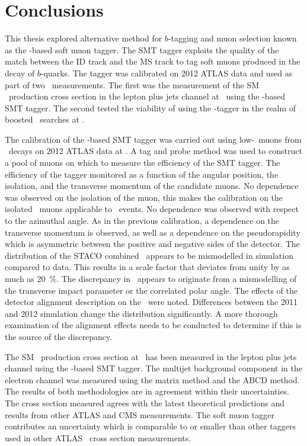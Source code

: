 \chapter{Conclusions}\label{ch:conclusions}

This thesis explored alternative method for $b$-tagging and muon selection known as the \xsm-based soft muon tagger. The SMT tagger exploits the quality of the match between the ID track and the MS track to tag soft muons produced in the decay of $b$-quarks. The tagger was calibrated on 2012 ATLAS data and used as part of two \ttbar\ measurements. The first was the measurement of the SM \ttbar\ production cross section in the lepton plus jets channel at \cmsS\ using the \xsm-based SMT tagger. The second tested the viability of using the \xsm-tagger in the realm of boosted \ttbar\ searches at \cmsE.

The calibration of the \xsm-based SMT tagger was carried out using low-\pt\ muons from \jpsi\ decays on 2012 ATLAS data at \cmsE. A tag and probe method was used to construct a pool of muons on which to measure the efficiency of the SMT tagger. The efficiency of the tagger monitored as a function of the angular position, the isolation, and the transverse momentum of the candidate muons. No dependence was observed on the isolation of the muon, this makes the calibration on the isolated \jpsi\ muons applicable to \ttbar\ events. No dependence was observed with respect to the azimuthal angle. As in the previous calibration, a dependence on the transverse momentum is observed, as well as a dependence on the pseudorapidity which is asymmetric between the positive and negative sides of the detector. The distribution of the STACO combined \xsd\ appears to be mismodelled in simulation compared to data. This results in a scale factor that deviates from unity by as much as \SI{20}{\percent}. The discrepancy in \xsd\ appears to originate from a mismodelling of the transverse impact parameter or the correlated polar angle. The effects of the detector alignment description on the \xsd\ were noted. Differences between the 2011 and 2012 simulation change the distribution significantly. A more thorough examination of the alignment effects needs to be conducted to determine if this is the source of the discrepancy.

The SM \ttbar\ production cross section at \cmsS\ has been measured in the lepton plus jets channel using the \xsm-based SMT tagger. The multijet background component in the electron channel was measured using the matrix method and the ABCD method. The results of both methodologies are in agreement within their uncertainties. The cross section measured agrees with the latest theoretical predictions and results from other ATLAS and CMS measurements. The soft muon tagger contributes an uncertainty which is comparable to or smaller than other taggers used in other ATLAS \ttbar\ cross section measurements.

